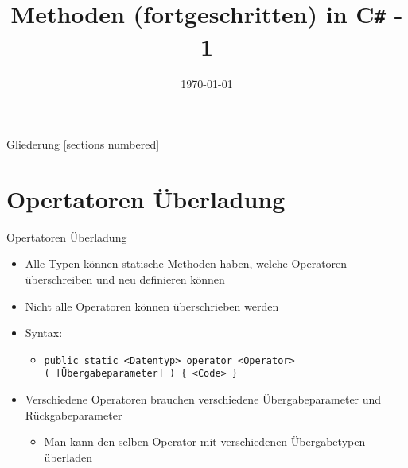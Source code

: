 



\title{Methoden (fortgeschritten) in C\texttt{\#} - 1}
\date{\today}




\maketitle

\begin{frame}{Gliederung}
	[sections numbered]
	\tableofcontents
\end{frame}

\section{Opertatoren Überladung}
\begin{frame}{Opertatoren Überladung}
	\begin{itemize}
		\item Alle Typen können statische Methoden haben, welche Operatoren überschreiben und neu definieren können
		\item Nicht alle Operatoren können überschrieben werden
		\item Syntax:
		\begin{itemize}
			\item \texttt{public static \alert{<Datentyp>} operator \alert{<Operator>}\\( \alert{[Übergabeparameter]} ) \{ \alert{<Code>} \}}
		\end{itemize}
		\item Verschiedene Operatoren brauchen verschiedene Übergabeparameter und Rückgabeparameter
		\begin{itemize}
			 \item Man kann den selben Operator mit verschiedenen Übergabetypen überladen
		\end{itemize}
	\end{itemize}
\end{frame}

